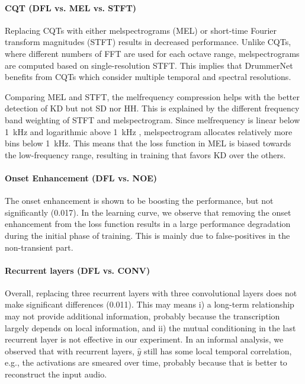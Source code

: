 \documentclass{article}
\newcommand{\largesqueeze}{\vspace{-0.2cm}}
\begin{document}
	\largesqueeze
	\paragraph{CQT (DFL vs. MEL vs. STFT)}
	
	Replacing CQTs with either melspectrograms (MEL) or short-time Fourier transform magnitudes (STFT) results in decreased performance. Unlike CQTs, where different numbers of FFT are used for each octave range, melspectrograms are computed based on single-resolution STFT. This implies that  DrummerNet benefits from CQTs which consider multiple temporal and spectral resolutions.
	
	Comparing MEL and STFT, the melfrequency compression helps with the better detection of KD but not SD nor HH. This is explained by the different frequency band weighting of STFT and melspectrogram. Since melfrequency is linear below 1~kHz and logarithmic above 1~kHz \cite{slaney1998auditory}, melspectrogram allocates relatively more bins below 1~kHz. This means that the loss function in MEL is biased towards the low-frequency range, resulting in training that favors KD over the others.
	
	\largesqueeze
	\paragraph{Onset Enhancement (DFL vs. NOE)}
	
	The onset enhancement is shown to be boosting the performance, but not significantly (0.017). In the learning curve, we observe that removing the onset enhancement from the loss function results in a large performance degradation during the initial phase of training. This is mainly due to false-positives in the non-transient part. 
	
	
	\largesqueeze
	\paragraph{Recurrent layers (DFL vs. CONV)}
	
	Overall, replacing three recurrent layers with three convolutional layers does not make significant differences (0.011). This may means i) a long-term relationship may not provide additional information, probably because the transcription largely depends on local information, and ii) the mutual conditioning in the last recurrent layer is not effective in our experiment. In an informal analysis, we observed that with recurrent layers, $\hat{y}$ still has some local temporal correlation, e.g., the activations are smeared over time, probably because that is better to reconstruct the input audio. 
	
\end{document}
